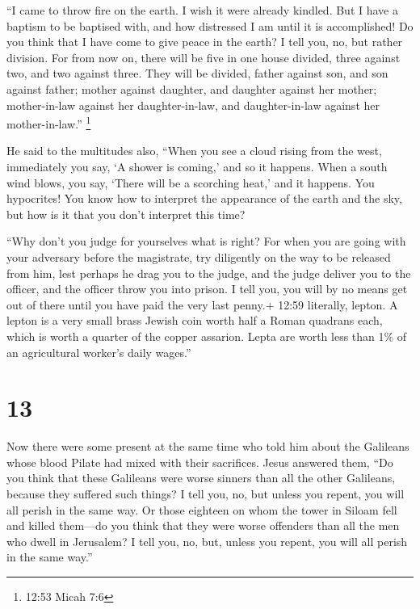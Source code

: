  ``I came to throw fire on the earth. I wish it were
already kindled.  But I have a baptism to be baptised with,
and how distressed I am until it is accomplished!  Do you
think that I have come to give peace in the earth? I tell you, no, but
rather division.  For from now on, there will be five in
one house divided, three against two, and two against three.
 They will be divided, father against son, and son against
father; mother against daughter, and daughter against her mother;
mother-in-law against her daughter-in-law, and daughter-in-law against
her mother-in-law.'' \footnote{12:53 Micah 7:6}

 He said to the multitudes also, ``When you see a cloud
rising from the west, immediately you say, `A shower is coming,' and so
it happens.  When a south wind blows, you say, `There will
be a scorching heat,' and it happens.  You hypocrites! You
know how to interpret the appearance of the earth and the sky, but how
is it that you don't interpret this time?

 ``Why don't you judge for yourselves what is right?
 For when you are going with your adversary before the
magistrate, try diligently on the way to be released from him, lest
perhaps he drag you to the judge, and the judge deliver you to the
officer, and the officer throw you into prison.  I tell
you, you will by no means get out of there until you have paid the very
last penny.+ 12:59 literally, lepton. A lepton is a very small brass
Jewish coin worth half a Roman quadrans each, which is worth a quarter
of the copper assarion. Lepta are worth less than 1\% of an agricultural
worker's daily wages.''

\hypertarget{section-12}{%
\section{13}\label{section-12}}

 Now there were some present at the same time who told him
about the Galileans whose blood Pilate had mixed with their sacrifices.
 Jesus answered them, ``Do you think that these Galileans
were worse sinners than all the other Galileans, because they suffered
such things?  I tell you, no, but unless you repent, you
will all perish in the same way.  Or those eighteen on whom
the tower in Siloam fell and killed them---do you think that they were
worse offenders than all the men who dwell in Jerusalem?  I
tell you, no, but, unless you repent, you will all perish in the same
way.''

